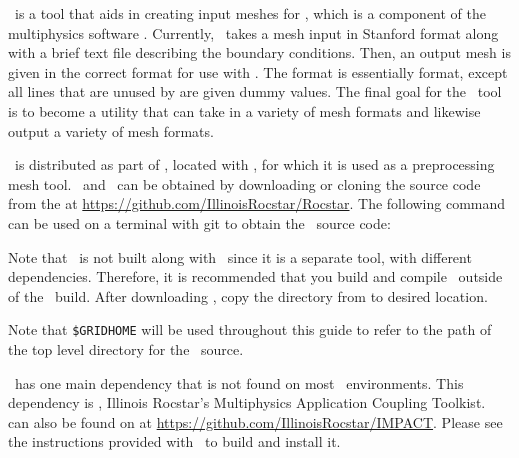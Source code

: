 \grid\, is a tool that aids in creating input meshes for , which is a component of the multiphysics software . Currently, \grid\, takes a mesh input in Stanford format along with a brief text file describing the boundary conditions. Then, an output mesh is given in the correct format for use with . The format is essentially  format, except all lines that are unused by  are given dummy values. The final goal for the \grid\, tool is to become a utility that can take in a variety of mesh formats and likewise output a variety of mesh formats. 




\grid\, is distributed as part of \rocstar, located with \rocfrac, for which it is used as a preprocessing mesh tool. \rocstar\, and \grid\, can be obtained by downloading or cloning the source code from the  at \url{https://github.com/IllinoisRocstar/Rocstar}. The following command can be used on a  terminal with git to obtain the \rocstar\, source code:


Note that \grid\, is not built along with \rocstar\, since it is a separate tool, with different dependencies. Therefore, it is recommended that you build and compile \grid\, outside of the \rocstar\, build. After downloading \rocstar, copy the directory  from  to desired location. 
 

Note that \texttt{\$GRIDHOME} will be used throughout this guide to refer to the path of the top level directory for the \grid\, source.


\grid\, has one main dependency that is not found on most \linux\, environments. This dependency is \impact, Illinois Rocstar's Multiphysics Application Coupling Toolkist. \impact\, can also be found on  at \url{https://github.com/IllinoisRocstar/IMPACT}. Please see the instructions provided with \impact\, to build and install it. 


